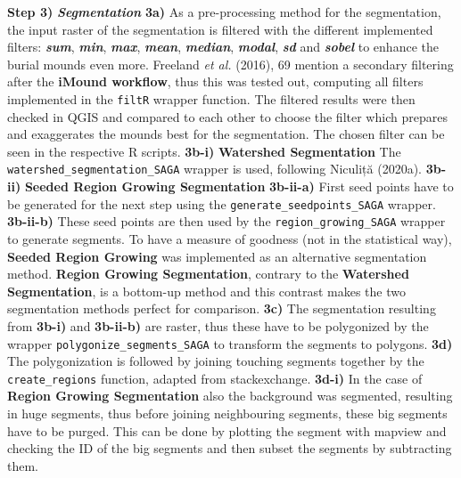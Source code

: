 \documentclass[
  12pt,
]{article}
\begin{document}
\textbf{Step 3)} \textbf{\emph{Segmentation}}
\newline
\textbf{3a)} As a pre-processing method for the segmentation, the input raster of the segmentation is filtered with the different implemented filters: \textbf{\emph{sum}}, \textbf{\emph{min}}, \textbf{\emph{max}}, \textbf{\emph{mean}}, \textbf{\emph{median}}, \textbf{\emph{modal}}, \textbf{\emph{sd}} and \textbf{\emph{sobel}} to enhance the burial mounds even more. Freeland \emph{et al.} (2016), 69 mention a secondary filtering after the \textbf{iMound workflow}, thus this was tested out, computing all filters implemented in the \texttt{filtR} wrapper function. The filtered results were then checked in QGIS and compared to each other to choose the filter which prepares and exaggerates the mounds best for the segmentation. The chosen filter can be seen in the respective R scripts.
\newline
\textbf{3b-i)} \textbf{Watershed Segmentation}
\newline
The \texttt{watershed\_segmentation\_SAGA} wrapper is used, following Niculiță (2020a).
\newline
\textbf{3b-ii)} \textbf{Seeded Region Growing Segmentation}
\newline
\textbf{3b-ii-a)} First seed points have to be generated for the next step using the \texttt{generate\_seedpoints\_SAGA} wrapper.
\newline
\textbf{3b-ii-b)} These seed points are then used by the \texttt{region\_growing\_SAGA} wrapper to generate segments. To have a measure of goodness (not in the statistical way), \textbf{Seeded Region Growing} was implemented as an alternative segmentation method. \textbf{Region Growing Segmentation}, contrary to the \textbf{Watershed Segmentation}, is a bottom-up method and this contrast makes the two segmentation methods perfect for comparison.
\newline
\textbf{3c)} The segmentation resulting from \textbf{3b-i)} and \textbf{3b-ii-b)} are raster, thus these have to be polygonized by the wrapper \texttt{polygonize\_segments\_SAGA} to transform the segments to polygons.
\newline
\textbf{3d)} The polygonization is followed by joining touching segments together by the \texttt{create\_regions} function, adapted from stackexchange.
\newline
\textbf{3d-i)} In the case of \textbf{Region Growing Segmentation} also the background was segmented, resulting in huge segments, thus before joining neighbouring segments, these big segments have to be purged. This can be done by plotting the segment with mapview and checking the ID of the big segments and then subset the segments by subtracting them.\\
\end{document}
